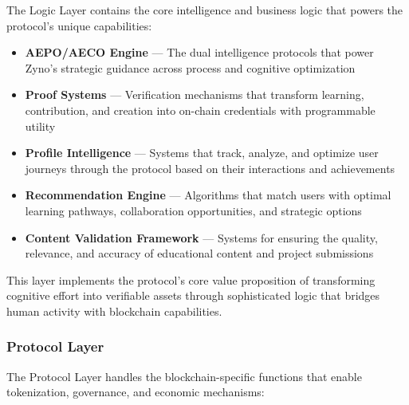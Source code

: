 The Logic Layer contains the core intelligence and business logic that powers the protocol's unique capabilities:

\begin{itemize}
    \item \textbf{AEPO/AECO Engine} — The dual intelligence protocols that power Zyno's strategic guidance across process and cognitive optimization
    
    \item \textbf{Proof Systems} — Verification mechanisms that transform learning, contribution, and creation into on-chain credentials with programmable utility
    
    \item \textbf{Profile Intelligence} — Systems that track, analyze, and optimize user journeys through the protocol based on their interactions and achievements
    
    \item \textbf{Recommendation Engine} — Algorithms that match users with optimal learning pathways, collaboration opportunities, and strategic options
    
    \item \textbf{Content Validation Framework} — Systems for ensuring the quality, relevance, and accuracy of educational content and project submissions
\end{itemize}

This layer implements the protocol's core value proposition of transforming cognitive effort into verifiable assets through sophisticated logic that bridges human activity with blockchain capabilities.

\subsubsection*{Protocol Layer}

The Protocol Layer handles the blockchain-specific functions that enable tokenization, governance, and economic mechanisms:

